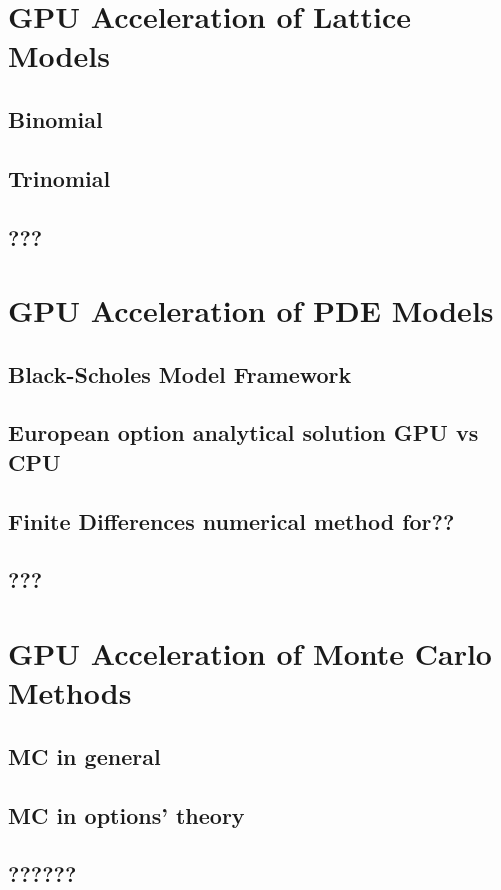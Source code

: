 \documentclass[english,12pt,a4paper,pdftex,sci,utf8]{aaltothesis}
\begin{document}
\clearpage

\section{GPU Acceleration of Lattice Models} \label{sec:gpu-lattice}
\subsection{Binomial}
\subsection{Trinomial}
\subsection{???}

\section{GPU Acceleration of PDE Models} \label{sec:gpu-pde}
\subsection{Black-Scholes Model Framework}
\subsection{European option analytical solution GPU vs CPU}
\subsection{Finite Differences numerical method for??}
\subsection{???}

\section{GPU Acceleration of Monte Carlo Methods} \label{sec:gpu-mc}
\subsection{MC in general}
\subsection{MC in options' theory}
\subsection{??????}
\end{document}
